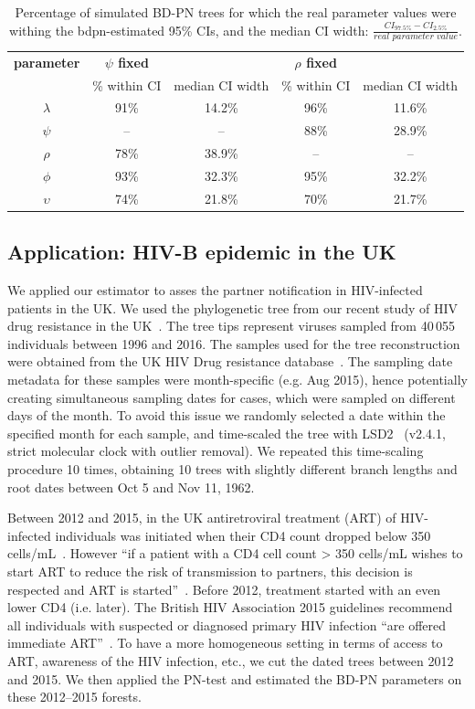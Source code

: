 \documentclass[a4paper,10pt]{article}
\begin{document}
 \begin{table}[!h]\centering
\small
\caption{Percentage of simulated BD-PN trees for which the real parameter values were withing the bdpn-estimated 95\% CIs, and the median CI width: $\frac{CI_{97.5\%} - CI_{2.5\%}}{\textit{real parameter value}}$. \smallskip}
\begin{tabular}{c|cc|cc}
\textbf{parameter} & \textbf{$\psi$ fixed} & & \textbf{$\rho$ fixed} &  \\
 & \% within CI & median CI width & \% within CI & median CI width  \\
\toprule 
 $\lambda$ &  91\% & 14.2\% & 96\% & 11.6\%\\
 $\psi$ & -- & -- & 88\% & 28.9\% \\
 $\rho$ & 78\%  & 38.9\% & -- & -- \\
 $\phi$ & 93\% & 32.3\% & 95\% & 32.2\% \\
 $\upsilon$ & 74\% & 21.8\% & 70\% & 21.7\% \\
\bottomrule
\end{tabular}
\label{tbl:ci}
\end{table}


\subsection{Application: HIV-B epidemic in the UK}
We applied our estimator to asses the partner notification in HIV-infected patients in the UK. We used the phylogenetic tree from our recent study of HIV drug resistance in the UK~\citep{zhukovaModelingDrugResistance2023}. The tree tips represent viruses sampled from 40\,055 individuals between 1996 and 2016. The samples used for the tree reconstruction were obtained from the UK HIV Drug resistance database~\citep{Dunn2007}. The sampling date metadata for these samples were month-specific (e.g. Aug 2015), hence potentially creating simultaneous sampling dates for cases, which were sampled on different days of the month. To avoid this issue we randomly selected a date within the specified month for each sample, and time-scaled the tree with LSD2~\citep{To2016} (v2.4.1, strict molecular clock with outlier removal). We repeated this time-scaling procedure 10 times, obtaining 10 trees with slightly different branch lengths and root dates between Oct 5 and Nov 11, 1962.

Between 2012 and 2015, in the UK antiretroviral treatment (ART) of HIV-infected individuals  was initiated when their CD4 count dropped below 350 cells/mL~\citep{williamsBritishHIVAssociation2012}. However ``if a patient with a CD4 cell count > 350 cells/mL wishes to start ART to reduce the risk of transmission to partners, this decision is respected and ART is started''~\citep{williamsBritishHIVAssociation2012}. Before 2012, treatment started with an even lower CD4 (i.e. later). The British HIV Association 2015 guidelines recommend all individuals with suspected or diagnosed primary HIV infection ``are offered immediate ART''~\citep{churchillBritishHIVAssociation2016}. To have a more homogeneous setting in terms of access to ART, awareness of the HIV infection, etc., we cut the dated trees between 2012 and 2015. We then applied the PN-test and estimated the BD-PN parameters on these 2012--2015 forests. 
\end{document}
